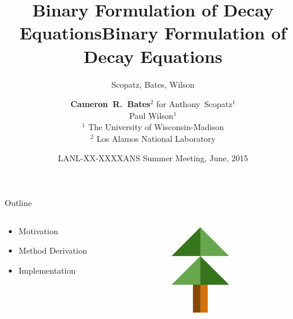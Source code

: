 \documentclass[xcolor=x11names,compress]{beamer}
\title{Binary Formulation of Decay Equations}
\author{Scopatz, Bates, Wilson}
\date{LANL-XX-XXXX}
\begin{document}
\begin{frame}
\title{Binary Formulation of Decay Equations}
\author{\textbf{Cameron~R.~Bates$^{2}$} for Anthony~Scopatz$^{1}$ \\
        \vspace{0.1in}
        Paul Wilson$^{1}$\\
        \vspace{0.1in}
        $^{1}$ The University of Wisconsin-Madison\\
        $^{2}$ Los Alamos National Laboratory}

\date{ANS Summer Meeting, June, 2015}
\titlepage
\end{frame}

\begin{frame}{Outline}
    \Large
	\begin{columns}
  	\begin{column}{0.5\textwidth}
	    \begin{itemize}
        \item Motivation
        \item Method Derivation
        \item Implementation
	    \end{itemize}
  	\end{column}
 	\begin{column}{0.4\textwidth}
 	   \begin{center}
 	   \begin{figure}
       \includegraphics[height=4cm]{pyne-icon-big.png}
	   \end{figure}
 	   \end{center}
  	\end{column}
	\end{columns}

\end{frame}

\end{document}
